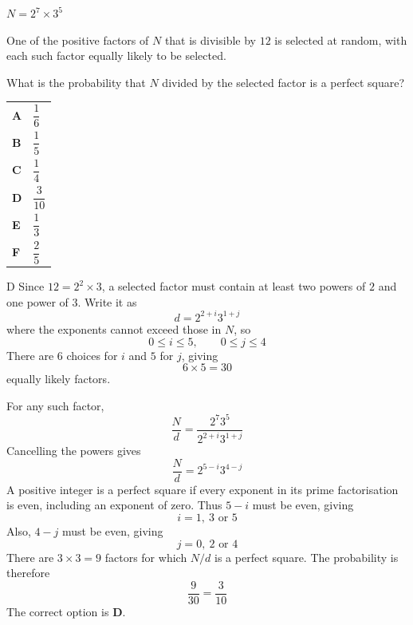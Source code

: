 \documentclass[11pt,a4paper]{article}
\begin{document}
\begin{enumerate}[label=\textbf{\arabic*.},leftmargin=*,itemsep=0pt,start=8]
$N=2^7 \times 3^5$

One of the positive factors of $N$ that is divisible by $12$ is selected at random, with each such factor equally likely to be selected.

What is the probability that $N$ divided by the selected factor is a perfect square?

\par\vspace*{12pt}
\begin{tabularx}{\linewidth}{@{}>{\bfseries}l Y@{}}
A &
$\dfrac{1}{6}$
\\[0.8em]
B &
$\dfrac{1}{5}$
\\[0.8em]
C &
$\dfrac{1}{4}$
\\[0.8em]
D &
$\dfrac{3}{10}$
\\[0.8em]
E &
$\dfrac{1}{3}$
\\[0.8em]
F &
$\dfrac{2}{5}$
\\
\end{tabularx}

\begin{djsSolution}{D}
Since $12=2^2\times3$, a selected factor must contain at least two powers of $2$ and one power of $3$. Write it as
\[
d=2^{2+i}3^{1+j}
\]
where the exponents cannot exceed those in $N$, so
\[
0\leq i\leq5,\qquad 0\leq j\leq4
\]
There are $6$ choices for $i$ and $5$ for $j$, giving
\[
6\times5=30
\]
equally likely factors.

For any such factor,
\[
\frac{N}{d}=\frac{2^7 3^5}{2^{2+i}3^{1+j}}
\]
Cancelling the powers gives
\[
\frac{N}{d}=2^{5-i}3^{4-j}
\]
A positive integer is a perfect square if every exponent in its prime factorisation is even, including an exponent of zero. Thus $5-i$ must be even, giving
\[
i=1,\ 3\text{ or }5
\]
Also, $4-j$ must be even, giving
\[
j=0,\ 2\text{ or }4
\]
There are $3\times3=9$ factors for which $N/d$ is a perfect square. The probability is therefore
\[
\frac{9}{30}=\frac{3}{10}
\]
The correct option is \textbf{D}.
\end{djsSolution}
\end{enumerate}
\end{document}
